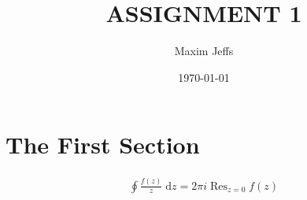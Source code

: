 \documentclass[11pt]{article}
\title{ASSIGNMENT 1}
\author{Maxim Jeffs}
\date{\today}
\theoremstyle{style}%
\theoremstyle{style}
\theoremstyle{style}
\theoremstyle{style}
\theoremstyle{style}
\theoremstyle{remark}%
\newcommand{\dd}{\; \mathrm{d}}
\DeclareMathOperator*{\Res}{Res}
\newcommand{\eqn}[1]{\begin{align*} #1 \end{align*}}
\begin{document}
\maketitle

\section*{The First Section}

\eqn{
\oint \frac{f(z)}{z} \dd{z} = 2 \pi i \Res_{z = 0} f(z)
}

\nocite{*}
{}

\end{document}
